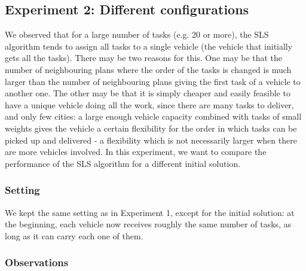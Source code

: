 \documentclass[10pt]{article}
\begin{document}
\subsection{Experiment 2: Different configurations}
We observed that for a large number of tasks (e.g. 20 or more), the SLS algorithm tends to assign all tasks to a single vehicle (the vehicle that initially gets all the tasks).
There may be two reasons for this. One may be that the number of neighbouring plans where the order of the tasks is changed is much larger than the number of neighbouring plans giving the first task of a vehicle to another one. 
The other may be that it is simply cheaper and easily feasible to have a unique vehicle doing all the work, since there are many tasks to deliver, and only few cities: a large enough vehicle capacity combined with tasks of small weights gives the vehicle a certain flexibility for the order in which tasks can be picked up and delivered - a flexibility which is not necessarily larger when there are more vehicles involved.
In this experiment, we want to compare the performance of the SLS algorithm for a different initial solution. 
\subsubsection{Setting}
We kept the same setting as in Experiment 1, except for the initial solution: at the beginning, each vehicle now receives roughly the same number of tasks, as long as it can carry each one of them.

\subsubsection{Observations}
\end{document}
